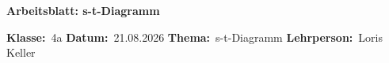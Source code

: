 \renewcommand{\solutiontitle}{\noindent\color{titleblue}\textbf{Lösung:}\enspace}

\pagestyle{headandfoot}

\newcommand{\Kopfzeile}[4]{%
  \begin{titlebox}
    {\color{white}\sffamily\bfseries\Large #4}
  \end{titlebox}
  \noindent\textbf{Klasse:}~#1 \hfill \textbf{Datum:}~#2 \hfill \textbf{Thema:}~#3
    \hfill \textbf{Lehrperson:}~Loris Keller
  \lhead{\textcolor{darkgray}{#3}}
  \rhead{\textcolor{darkgray}{#4}}
}

\newlength{\antwortraumlen}
\newcommand{\Antwortraum}[1]{%
  \pgfmathsetlength{\antwortraumlen}{#1*2.5cm}%
  \begin{answerbox}
    \rule{0pt}{\antwortraumlen}%
  \end{answerbox}%
}

\newcommand{\Klasse}{4a}
\newcommand{\Datum}{21.08.2026}
\newcommand{\Thema}{s-t-Diagramm}
\newcommand{\ArbeitsblattTitel}{Arbeitsblatt: s-t-Diagramm}



\Kopfzeile{\Klasse}{\Datum}{\Thema}{\ArbeitsblattTitel}

